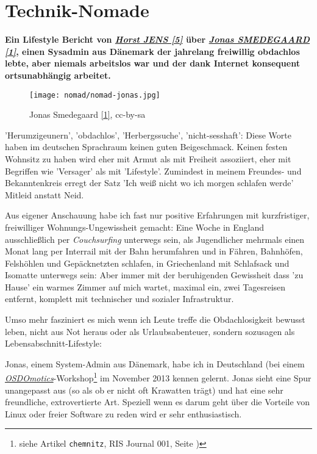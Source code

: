 \section*{Technik-Nomade}
\hypertarget{nomad}{}
\label{nomad}

\textbf{Ein Lifestyle Bericht von \href{http://spielend-programmieren.at}{\textit{Horst JENS [5]}} \"uber \href{http://dr.jones.dk}{\textit{Jonas SMEDEGAARD [1]}}, einen Sysadmin aus D\"anemark der jahrelang freiwillig obdachlos lebte, aber niemals arbeitslos war und der dank Internet konsequent ortsunabh\"angig arbeitet.}
\begin{figure}
\texttt{[image: nomad/nomad-jonas.jpg]}
\caption{Jonas Smedegaard \href{http://dr.jones.dk}{{[}1{]}}, cc-by-sa}
\end{figure}

'Herumzigeunern', 'obdachlos', 'Herbergssuche', 'nicht-sesshaft': Diese Worte haben im deutschen Sprachraum keinen guten Beigeschmack. Keinen festen Wohnsitz zu haben wird eher mit Armut als mit Freiheit assoziiert, eher mit Begriffen wie 'Versager' als mit 'Lifestyle'. Zumindest in meinem Freundes- und Bekanntenkreis erregt der Satz 'Ich weiß nicht wo ich morgen schlafen werde' Mitleid anstatt Neid.

Aus eigener Anschauung habe ich fast nur positive Erfahrungen mit kurzfristiger, freiwilliger Wohnungs-Ungewissheit gemacht: Eine Woche in England ausschließlich per \textit{Couchsurfing} unterwegs sein, als Jugendlicher mehrmals einen Monat lang per Interrail mit der Bahn herumfahren und in Fähren, Bahnhöfen, Felshöhlen und Gepäcknetzten schlafen, in Griechenland mit Schlafsack und Isomatte unterwegs sein: Aber immer mit der beruhigenden Gewissheit dass 'zu Hause' ein warmes Zimmer auf mich wartet, maximal ein, zwei Tagesreisen entfernt, komplett mit technischer und sozialer Infrastruktur. 

Umso mehr fasziniert es mich wenn ich Leute treffe die Obdachlosigkeit bewusst leben, nicht aus Not heraus oder als Urlaubsabenteuer, sondern sozusagen als Lebensabschnitt-Lifestyle: 

Jonas, einem System-Admin aus Dänemark, habe ich in Deutschland (bei einem \href{http://osdomotics.com}{\textit{OSDOmotics}}-Workshop\footnote{siehe Artikel \texttt{chemnitz}, RIS Journal 001, Seite \pageref{chemnitz})} im November 2013 kennen gelernt. Jonas sieht eine Spur unangepasst aus (so als ob er nicht oft Krawatten trägt) und hat eine sehr freundliche, extrovertierte Art. Speziell wenn es darum geht über die Vorteile von Linux oder freier Software zu reden wird er sehr enthusiastisch. 

